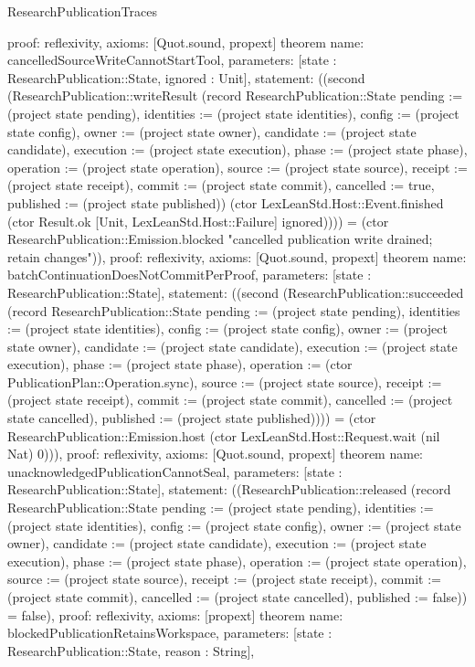 \begin{lexlean}{ResearchPublicationTraces}
\begin{semanticmodule}
{ proof: reflexivity{},
 axioms: [Quot.sound, propext]
}
theorem{
 name: cancelledSourceWriteCannotStartTool,
 parameters: [state : ResearchPublication::State, ignored : Unit],
 statement: ((second (ResearchPublication::writeResult (record ResearchPublication::State {pending := (project state pending), identities := (project state identities), config := (project state config), owner := (project state owner), candidate := (project state candidate), execution := (project state execution), phase := (project state phase), operation := (project state operation), source := (project state source), receipt := (project state receipt), commit := (project state commit), cancelled := true, published := (project state published)}) (ctor LexLeanStd.Host::Event.finished (ctor Result.ok [Unit, LexLeanStd.Host::Failure] ignored)))) = (ctor ResearchPublication::Emission.blocked "cancelled publication write drained; retain changes")),
 proof: reflexivity{},
 axioms: [Quot.sound, propext]
}
theorem{
 name: batchContinuationDoesNotCommitPerProof,
 parameters: [state : ResearchPublication::State],
 statement: ((second (ResearchPublication::succeeded (record ResearchPublication::State {pending := (project state pending), identities := (project state identities), config := (project state config), owner := (project state owner), candidate := (project state candidate), execution := (project state execution), phase := (project state phase), operation := (ctor PublicationPlan::Operation.sync), source := (project state source), receipt := (project state receipt), commit := (project state commit), cancelled := (project state cancelled), published := (project state published)}))) = (ctor ResearchPublication::Emission.host (ctor LexLeanStd.Host::Request.wait (nil Nat) 0))),
 proof: reflexivity{},
 axioms: [Quot.sound, propext]
}
theorem{
 name: unacknowledgedPublicationCannotSeal,
 parameters: [state : ResearchPublication::State],
 statement: ((ResearchPublication::released (record ResearchPublication::State {pending := (project state pending), identities := (project state identities), config := (project state config), owner := (project state owner), candidate := (project state candidate), execution := (project state execution), phase := (project state phase), operation := (project state operation), source := (project state source), receipt := (project state receipt), commit := (project state commit), cancelled := (project state cancelled), published := false})) = false),
 proof: reflexivity{},
 axioms: [propext]
}
theorem{
 name: blockedPublicationRetainsWorkspace,
 parameters: [state : ResearchPublication::State, reason : String],
}
\end{semanticmodule}
\end{lexlean}
